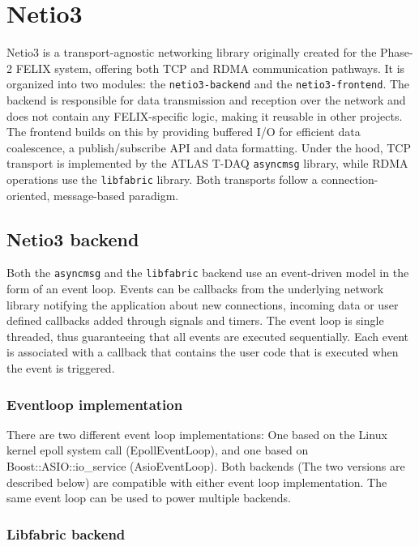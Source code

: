 \chapter{Netio3}
\label{chap:netio3}

Netio3 \cite{netio3-docs} is a transport-agnostic networking library originally created for the Phase-2 \acs{FELIX} system, offering both TCP and \acs{RDMA} communication pathways.  It is organized into two modules: the \texttt{netio3-backend} and the \texttt{netio3-frontend}.  The backend is responsible for data transmission and reception over the network and does not contain any \acs{FELIX}-specific logic, making it reusable in other projects. The frontend builds on this by providing buffered I/O for efficient data coalescence, a publish/subscribe API and data formatting.  Under the hood, TCP transport is implemented by the \acs{ATLAS} \acs{T-DAQ} \texttt{asyncmsg} \cite{asyncmsg} library, while \acs{RDMA} operations use the \texttt{libfabric} \cite{libfabric} library.  Both transports follow a connection-oriented, message-based paradigm.

\section{Netio3 backend}

Both the \texttt{asyncmsg} and the \texttt{libfabric} backend use an event-driven model in the form of an event loop. Events can be callbacks from the underlying network library notifying the application about new connections, incoming data or user defined callbacks added through signals and timers. The event loop is single threaded, thus guaranteeing that all events are executed sequentially. Each event is associated with a callback that contains the user code that is executed when the event is triggered.

\subsection{Eventloop implementation}

There are two different event loop implementations: One based on the Linux kernel epoll system call (EpollEventLoop), and one based on Boost::ASIO::io\_service (AsioEventLoop). Both backends (The two versions are described below) are compatible with either event loop implementation. The same event loop can be used to power multiple backends.


\subsection{Libfabric backend}
\label{subsec:libfabric}

